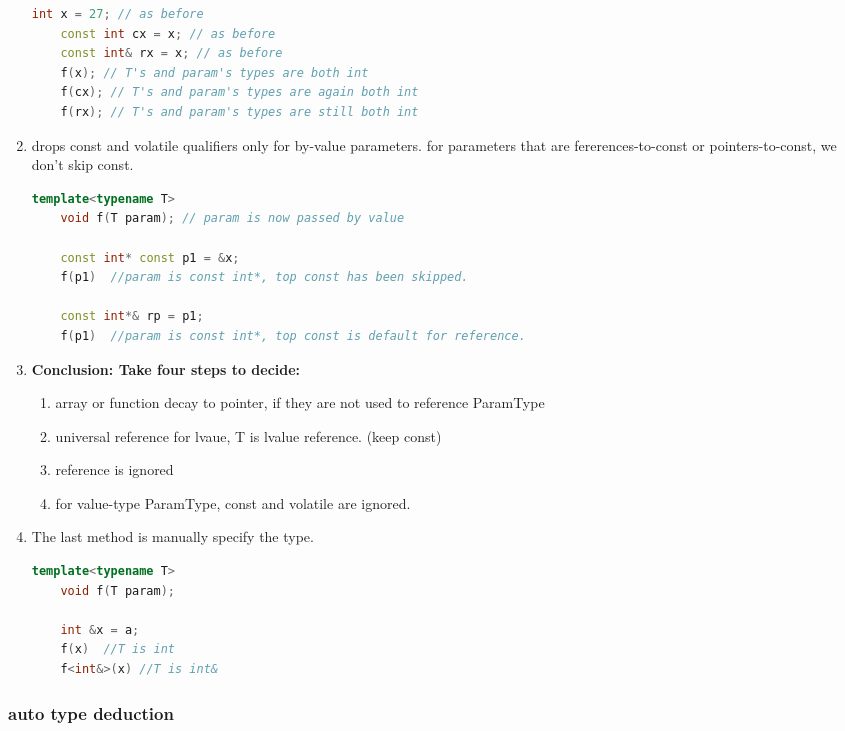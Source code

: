 \documentclass[a4paper,12pt,twoside]{book}
\begin{document}
\begin{enumerate}
\begin{lstlisting}[frame=single, language=c++]
	int x = 27; // as before
	const int cx = x; // as before
	const int& rx = x; // as before
	f(x); // T's and param's types are both int
	f(cx); // T's and param's types are again both int
	f(rx); // T's and param's types are still both int
	\end{lstlisting}
	
	\item  drops const and volatile qualifiers only for by-value parameters. for parameters that are fererences-to-const or pointers-to-const, we don't skip const.
	
\begin{lstlisting}[frame=single, language=c++]
	template<typename T>
	void f(T param); // param is now passed by value
	
	const int* const p1 = &x;
	f(p1)  //param is const int*, top const has been skipped. 
	
	const int*& rp = p1;
	f(p1)  //param is const int*, top const is default for reference. 
\end{lstlisting}
	
	\item \textbf{Conclusion:  Take four steps to decide:}
	\begin{enumerate}
		\item array or function decay to pointer, if they are not used to reference ParamType
		\item universal reference for lvaue, T is lvalue reference. (keep const)
		\item reference is ignored
		\item for value-type ParamType, const and volatile are ignored.
	\end{enumerate}
	
	\item The last method is manually specify the type.  
	\begin{lstlisting}[frame=single, language=c++]
	template<typename T>
	void f(T param); 
	
	int &x = a;
	f(x)  //T is int
    f<int&>(x) //T is int&
	\end{lstlisting}
	
\end{enumerate}

\subsubsection{auto type deduction}
\end{document}
